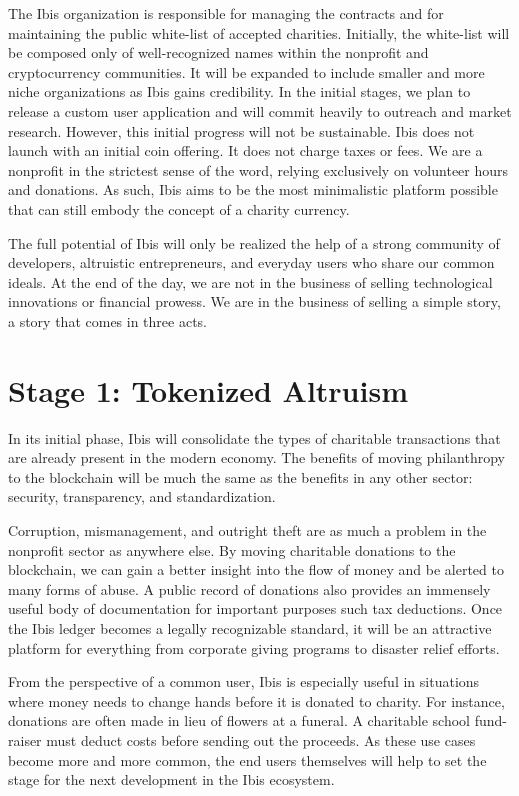 \documentclass{article} \usepackage{parskip} \usepackage{titlesec}
\begin{document}
The Ibis organization is responsible for managing the contracts and for
maintaining the public white-list of accepted charities. Initially, the
white-list will be composed only of well-recognized names within the nonprofit
and cryptocurrency communities. It will be expanded to include smaller and more
niche organizations as Ibis gains credibility. In the initial stages, we plan
to release a custom user application and will commit heavily to outreach and
market research. However, this initial progress will not be sustainable. Ibis
does not launch with an initial coin offering. It does not charge taxes or
fees. We are a nonprofit in the strictest sense of the word, relying exclusively
on volunteer hours and donations. As such, Ibis aims to be the most minimalistic
platform possible that can still embody the concept of a charity currency.

The full potential of Ibis will only be realized the help of a strong community
of developers, altruistic entrepreneurs, and everyday users who share our common
ideals. At the end of the day, we are not in the business of selling
technological innovations or financial prowess. We are in the business of
selling a simple story, a story that comes in three acts.

\section{Stage 1: Tokenized Altruism}

In its initial phase, Ibis will consolidate the types of charitable transactions
that are already present in the modern economy. The benefits of moving
philanthropy to the blockchain will be much the same as the benefits in any
other sector: security, transparency, and standardization.

Corruption, mismanagement, and outright theft are as much a problem in the
nonprofit sector as anywhere else. By moving charitable donations to the
blockchain, we can gain a better insight into the flow of money and be alerted
to many forms of abuse. A public record of donations also provides an immensely
useful body of documentation for important purposes such tax deductions. Once
the Ibis ledger becomes a legally recognizable standard, it will be an
attractive platform for everything from corporate giving programs to disaster
relief efforts.

From the perspective of a common user, Ibis is especially useful in situations
where money needs to change hands before it is donated to charity. For instance,
donations are often made in lieu of flowers at a funeral. A charitable school
fund-raiser must deduct costs before sending out the proceeds. As these use
cases become more and more common, the end users themselves will help to set the
stage for the next development in the Ibis ecosystem.
\end{document}
